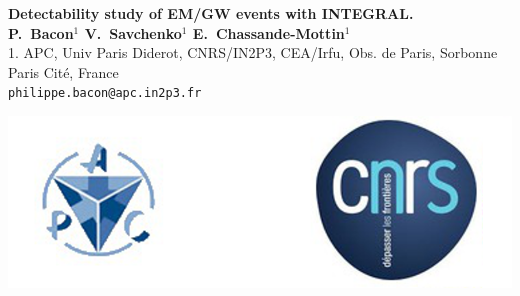 \documentclass[a0,portrait]{a0poster}
\begin{document}


\begin{minipage}[b]{0.75\linewidth}
  \Huge \textbf{Detectability study of EM/GW events with INTEGRAL.}\\[1cm] %
  \large \textbf{P.~Bacon$^{1}$ V.~Savchenko$^{1}$  E.~Chassande-Mottin$^{1}$}\\[1cm] %
  \normalsize 1. APC, Univ Paris Diderot, CNRS/IN2P3, CEA/Irfu, Obs. de Paris, Sorbonne Paris Cit\'e, France\\
  \large \texttt{philippe.bacon@apc.in2p3.fr}\\
\end{minipage}
%
\begin{minipage}[b]{0.25\linewidth}
	\includegraphics[width=20cm]{logo.png}
\end{minipage}

\vspace{1cm} %

\end{document}
